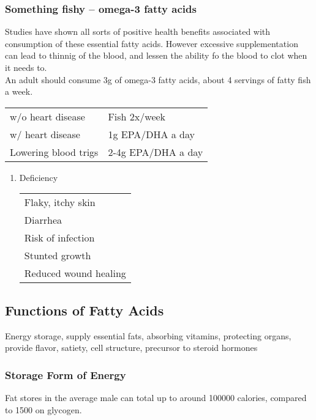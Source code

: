 \documentclass[letterpaper, 11pt]{article}
\begin{document}
\subsubsection{Something fishy -- omega-3 fatty acids}
\label{sec:org9bcd16d}
Studies have shown all sorts of positive health benefits associated with consumption of these essential fatty acids. However excessive supplementation can lead to thinnig of the blood, and lessen the ability fo the blood to clot when it needs to.\\
An adult should consume 3g of omega-3 fatty acids, about 4 servings of fatty fish a week.\\
\begin{center}
\begin{tabular}{ll}
w/o heart disease & Fish 2x/week\\
w/ heart disease & 1g EPA/DHA a day\\
Lowering blood trigs & 2-4g EPA/DHA a day\\
\end{tabular}
\end{center}
\begin{enumerate}
\item Deficiency
\label{sec:orgaf7a921}
\begin{center}
\begin{tabular}{l}
Flaky, itchy skin\\
Diarrhea\\
Risk of infection\\
Stunted growth\\
Reduced wound healing\\
\end{tabular}
\end{center}
\end{enumerate}
\subsection{Functions of Fatty Acids}
\label{sec:org1519d11}
Energy storage, supply essential fats, absorbing vitamins, protecting organs, provide flavor, satiety, cell structure, precursor to steroid hormones\\
\subsubsection{Storage Form of Energy}
\label{sec:org0779ff8}
Fat stores in the average male can total up to around 100000 calories, compared to 1500 on glycogen.\\
\end{document}
